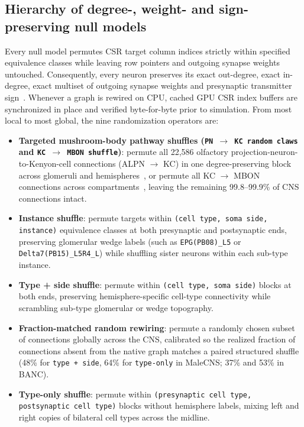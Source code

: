 \documentclass[11pt,a4paper]{article}
\begin{document}
\subsection{Hierarchy of degree-, weight- and sign-preserving null models}
Every null model permutes CSR target column indices strictly within specified equivalence classes while leaving row pointers and outgoing synapse weights untouched. Consequently, every neuron preserves its exact out-degree, exact in-degree, exact multiset of outgoing synapse weights and presynaptic transmitter sign~\cite{maslov2002specificity}. Whenever a graph is rewired on CPU, cached GPU CSR index buffers are synchronized in place and verified byte-for-byte prior to simulation. From most local to most global, the nine randomization operators are:

\begin{itemize}
  \item \textbf{Targeted mushroom-body pathway shuffles (\texttt{PN $\rightarrow$ KC random claws} and \texttt{KC $\rightarrow$ MBON shuffle})}: permute all 22,586 olfactory projection-neuron-to-Kenyon-cell connections (ALPN $\rightarrow$ KC) in one degree-preserving block across glomeruli and hemispheres~\cite{caron2013random}, or permute all KC $\rightarrow$ MBON connections across compartments~\cite{aso2014neuronal}, leaving the remaining 99.8--99.9\% of CNS connections intact.
  \item \textbf{Instance shuffle}: permute targets within \texttt{(cell type, soma side, instance)} equivalence classes at both presynaptic and postsynaptic ends, preserving glomerular wedge labels (such as \texttt{EPG(PB08)\_L5} or \texttt{Delta7(PB15)\_L5R4\_L}) while shuffling sister neurons within each sub-type instance.
  \item \textbf{Type + side shuffle}: permute within \texttt{(cell type, soma side)} blocks at both ends, preserving hemisphere-specific cell-type connectivity while scrambling sub-type glomerular or wedge topography.
  \item \textbf{Fraction-matched random rewiring}: permute a randomly chosen subset of connections globally across the CNS, calibrated so the realized fraction of connections absent from the native graph matches a paired structured shuffle (48\% for \texttt{type + side}, 64\% for \texttt{type-only} in MaleCNS; 37\% and 53\% in BANC).
  \item \textbf{Type-only shuffle}: permute within \texttt{(presynaptic cell type, postsynaptic cell type)} blocks without hemisphere labels, mixing left and right copies of bilateral cell types across the midline.

\end{itemize}
\end{document}
